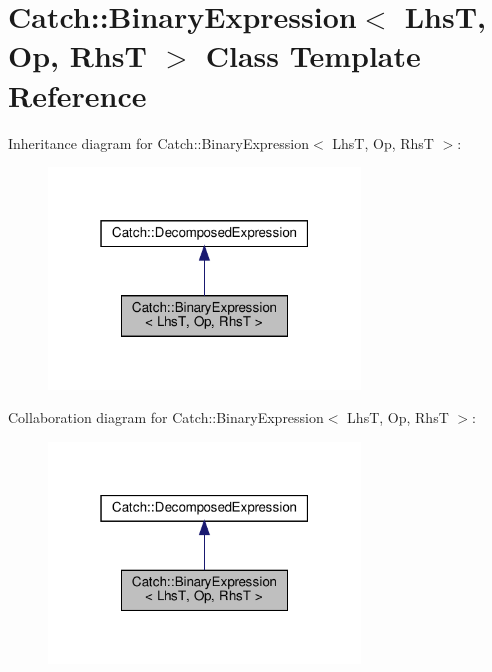 \hypertarget{classCatch_1_1BinaryExpression}{}\section{Catch\+:\+:Binary\+Expression$<$ LhsT, Op, RhsT $>$ Class Template Reference}
\label{classCatch_1_1BinaryExpression}


Inheritance diagram for Catch\+:\+:Binary\+Expression$<$ LhsT, Op, RhsT $>$\+:
\nopagebreak
\begin{figure}[H]
\begin{center}
\leavevmode
\includegraphics[width=235pt]{classCatch_1_1BinaryExpression__inherit__graph}
\end{center}
\end{figure}


Collaboration diagram for Catch\+:\+:Binary\+Expression$<$ LhsT, Op, RhsT $>$\+:
\nopagebreak
\begin{figure}[H]
\begin{center}
\leavevmode
\includegraphics[width=235pt]{classCatch_1_1BinaryExpression__coll__graph}
\end{center}
\end{figure}
